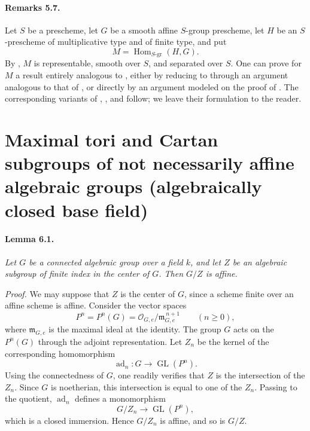\paragraph{\textbf{Remarks 5.7.}}
Let \(S\) be a prescheme, let \(G\) be a smooth affine \(S\)-group
prescheme, let \(H\) be an \(S\)-prescheme of multiplicative type
and of finite type, and put
\[
  M=\operatorname{Hom}_{S\text{-gr}}(H,G).
\]
By , \(M\) is representable, smooth over \(S\), and separated
over \(S\). One can prove for \(M\) a result entirely analogous to
, either by reducing to  through an argument analogous to that
of , or directly by an argument modeled on the proof of .
The corresponding variants of , , and  follow; we leave
their formulation to the reader.

\section[Maximal tori and Cartan subgroups]
{Maximal tori and Cartan subgroups of not necessarily affine
algebraic groups \textup{(algebraically closed base field)}}

\paragraph{\textbf{Lemma 6.1.}}
\emph{Let \(G\) be a connected algebraic group over a field \(k\),
and let \(Z\) be an algebraic subgroup of finite index in the center
of \(G\). Then \(G/Z\) is affine.}

\emph{Proof.}
We may suppose that \(Z\) is the center of \(G\), since a scheme
finite over an affine scheme is affine. Consider the vector spaces
\[
  P^n=P^n(G)=
  \mathcal O_{G,e}/\mathfrak m_{G,e}^{\,n+1}
  \qquad (n\geq 0),
\]
where \(\mathfrak m_{G,e}\) is the maximal ideal at the identity.
The group \(G\) acts on the \(P^n(G)\) through the adjoint
representation. Let \(Z_n\) be the kernel of the corresponding
homomorphism
\[
  \operatorname{ad}_n:G\longrightarrow \operatorname{GL}(P^n).
\]
Using the connectedness of \(G\), one readily verifies that \(Z\)
is the intersection of the \(Z_n\). Since \(G\) is noetherian, this
intersection is equal to one of the \(Z_n\). Passing to the quotient,
\(\operatorname{ad}_n\) defines a monomorphism
\[
  G/Z_n\longrightarrow \operatorname{GL}(P^n),
\]
which is a closed immersion. Hence \(G/Z_n\) is affine, and so is
\(G/Z\).

